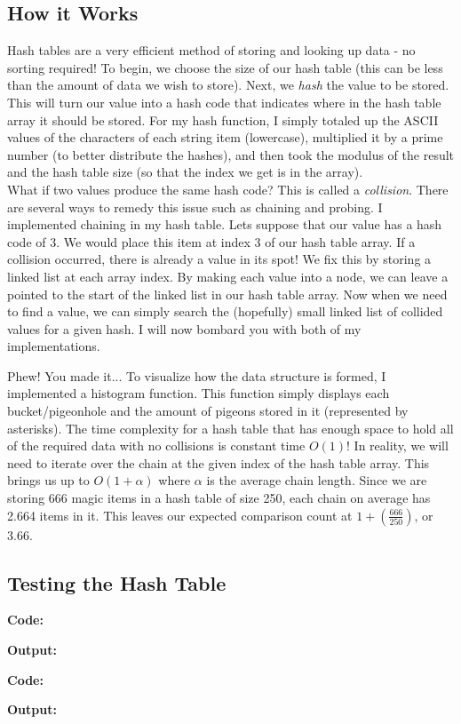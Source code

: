 \documentclass[letterpaper, 10pt]{article}
\begin{document}
\subsection{How it Works}
Hash tables are a very efficient method of storing and looking up data - no sorting required! To begin, we choose the size of our hash table (this can be less than the amount of data we wish to store). Next, we \textit{hash} the value to be stored. This will turn our value into a hash code that indicates where in the hash table array it should be stored. For my hash function, I simply totaled up the ASCII values of the characters of each string item (lowercase), multiplied it by a prime number (to better distribute the hashes), and then took the modulus of the result and the hash table size (so that the index we get is in the array). \\
\newline
What if two values produce the same hash code? This is called a \textit{collision}. There are several ways to remedy this issue such as chaining and probing. I implemented chaining in my hash table. Lets suppose that our value has a hash code of 3. We would place this item at index 3 of our hash table array. If a collision occurred, there is already a value in its spot! We fix this by storing a linked list at each array index. By making each value into a node, we can leave a pointed to the start of the linked list in our hash table array. Now when we need to find a value, we can simply search the (hopefully) small linked list of collided values for a given hash. I will now bombard you with both of my implementations.
\newpage


\noindent
Phew! You made it... To visualize how the data structure is formed, I implemented a histogram function. This function simply displays each bucket/pigeonhole and the amount of pigeons stored in it (represented by asterisks). The time complexity for a hash table that has enough space to hold all of the required data with no collisions is constant time $O(1)$! In reality, we will need to iterate over the chain at the given index of the hash table array. This brings us up to $O(1+\alpha)$ where $\alpha$ is the average chain length. Since we are storing 666 magic items in a hash table of size 250, each chain on average has 2.664 items in it. This leaves our expected comparison count at $1+(\frac{666}{250})$, or 3.66. 
\subsection{Testing the Hash Table}
\textbf{Code:}

\textbf{Output:}
 
\textbf{Code:}

\textbf{Output:}
 
\end{document}
